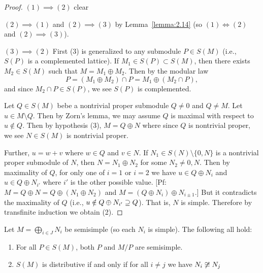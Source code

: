 \begin{proof}
$(1)\implies(2)$ clear

$(2)\implies(1)$ and $(2)\implies(3)$ by Lemma~\ref{lemma:2.14} (so
  $(1)\iff(2)$ and $(2)\implies (3)$).

$(3)\implies(2)$ First (3) is generalized to any submodule $P\in S(M)$
(i.e., $S(P)$ is a complemented lattice). If $M_{1}\in S(P)\subset S(M)$,
then there exists $M_{2}\in S(M)$ such that $M=M_{1}\oplus M_{2}$.
Then by the modular law
\begin{equation}
P=(M_{1}\oplus M_{2})\cap P=M_{1}\oplus(M_{2}\cap P),
\end{equation}
and since $M_{2}\cap P\in S(P)$, we see $S(P)$ is complemented.

Let $Q\in S(M)$ bebe a nontrivial proper submodule $Q\neq0$ and $Q\neq M$.
Let $u\in M\setminus Q$. Then by  Zorn's lemma, we may assume $Q$ is
maximal with respect to $u\notin Q$. Then by hypothesis (3),
$M=Q\oplus N$ where since $Q$ is nontrivial proper, we see $N\in S(M)$
is nontrivial proper.

Further, $u=w+v$ where $w\in Q$ and $v\in N$. If $N_{1}\in S(N)\setminus\{0,N\}$
is a nontrivial proper submodule of $N$, then $N=N_{1}\oplus N_{2}$
for some $N_{2}\neq0,N$. Then by maximality of $Q$, for only one of
$i=1$ or $i=2$ we have $u\in Q\oplus N_{i}$ and $u\in Q\oplus N_{i'}$ 
where $i'$ is the other possible value. [Pf: $M=Q\oplus N=Q\oplus(N_{1}\oplus N_{2})$
and $M=(Q\oplus N_{i})\oplus N_{i\pm 1}$.]
But it contradicts the maximality of $Q$ (i.e., $u\notin Q\oplus N_{i'}\propersupset Q$).
That is, $N$ is simple. Therefore by transfinite induction we obtain (2).
\end{proof}

\begin{corollary}\label{cor:2.16}
Let $M=\bigoplus_{i\in J}N_{i}$ be semisimple (so each $N_{i}$ is simple).
The following all hold:
\begin{enumerate}
\item For all $P\in S(M)$, both $P$ and $M/P$ are semisimple.
\item $S(M)$ is distributive if and only if for all $i\neq j$ we have
  $N_{i}\not\cong N_{j}$
\end{enumerate}
\end{corollary}

